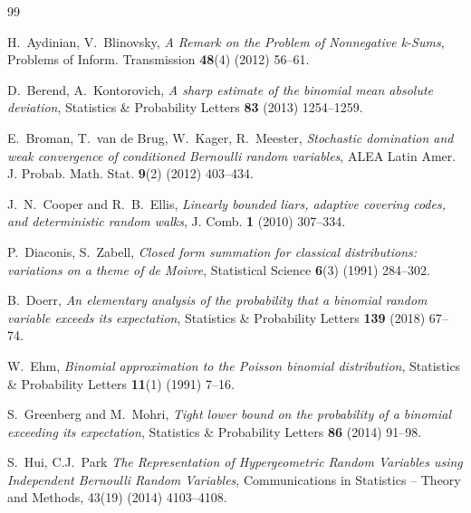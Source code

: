 \documentclass[10pt]{article}
\theoremstyle{plain}
\theoremstyle{definition}
\theoremstyle{remark}
\begin{document}
\begin{thebibliography}{99}



 H.~Aydinian, V.~Blinovsky, \textit{A Remark on the Problem of Nonnegative k-Sums}, Problems of Inform. Transmission \textbf{48}(4) (2012) 56--61. 

 D.~Berend, A.~Kontorovich, \textit{A sharp estimate of the binomial mean absolute deviation}, Statistics \& Probability Letters \textbf{83} (2013) 1254--1259.

 E.~Broman, T.~van de Brug, W.~Kager, R.~Meester, \textit{Stochastic domination and weak
convergence of conditioned Bernoulli random variables}, ALEA Latin Amer. J. Probab.
Math. Stat. \textbf{9}(2) (2012) 403--434.


 J.~N.~Cooper and R.~B.~Ellis,  \textit{Linearly bounded liars, adaptive covering codes, and
deterministic random walks},  J. Comb. \textbf{1} (2010) 307--334. 


 P.~Diaconis, S.~Zabell, \textit{Closed form summation for classical distributions: variations
on a theme of de Moivre}, Statistical Science \textbf{6}(3) (1991) 284--302.


 B.~Doerr, \textit{An elementary analysis of the probability that a binomial random variable exceeds its expectation}, Statistics \& Probability Letters \textbf{139} (2018) 67--74.



 W.~Ehm, \textit{Binomial approximation to the Poisson binomial distribution},  Statistics \& Probability Letters \textbf{11}(1) (1991) 7--16.



 S.~Greenberg and M.~Mohri, \textit{Tight lower bound on the probability of a binomial
exceeding its expectation}, Statistics \& Probability Letters \textbf{86} (2014) 91--98.


 S.~Hui,  C.J.~Park \textit{The Representation of Hypergeometric Random Variables using Independent Bernoulli Random Variables}, Communications in Statistics -- Theory and Methods, 43(19) (2014) 4103--4108.


\end{thebibliography}
\end{document}
